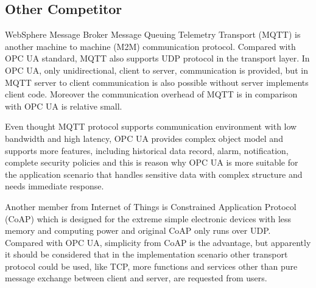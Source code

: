 \documentclass[]{llncs}
\begin{document}
\subsection{Other Competitor}
WebSphere Message Broker Message Queuing Telemetry Transport (MQTT)\cite{Ref3} is another machine to machine (M2M) communication protocol. Compared with OPC UA standard, MQTT also supports UDP protocol in the transport layer. In OPC UA, only unidirectional, client to server, communication is provided, but in MQTT server to client communication is also possible without server implements client code. Moreover the communication overhead of MQTT is in comparison with OPC UA is relative small. 


Even thought MQTT protocol supports communication environment with low bandwidth and high latency, OPC UA provides complex object model and supports more features, including historical data record, alarm, notification, complete security policies and this is reason why OPC UA is more suitable for the application scenario that handles sensitive data with complex structure and needs immediate response.


Another member from Internet of Things is Constrained Application Protocol (CoAP)\cite{Ref5} which is designed for the extreme simple electronic devices with less memory and computing power and original CoAP only runs over UDP. Compared with OPC UA, simplicity from CoAP is the advantage, but apparently it should be considered that in the implementation scenario other transport protocol could be used, like TCP, more functions and services other than pure message exchange between client and server, are requested from users.
\end{document}

